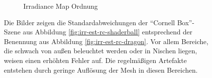 \begin{figure}[h]
\begin{subfigure}[b]{0.5\textwidth}
			\caption{Irradiance Map Ordnung}
		\end{subfigure}
		\caption[Irradiance-Map anhand der \enquote{Cornell Box}-Szene]{Die Bilder zeigen die Standardabweichungen der \enquote{Cornell Box}-Szene aus Abbildung \ref{fig:irr-est-rc-shaderball} entsprechend der Benennung aus Abbildung \ref{fig:irr-est-rc-dragon}. Vor allem Bereiche, die schwach von außen beleuchtet werden oder in Nischen liegen, weisen einen erhöhten Fehler auf. Die regelmäßigen Artefakte entstehen durch geringe Auflösung der Mesh in diesen Bereichen.}
		\label{fig:irr-map-cornell}
	\end{figure}

	

